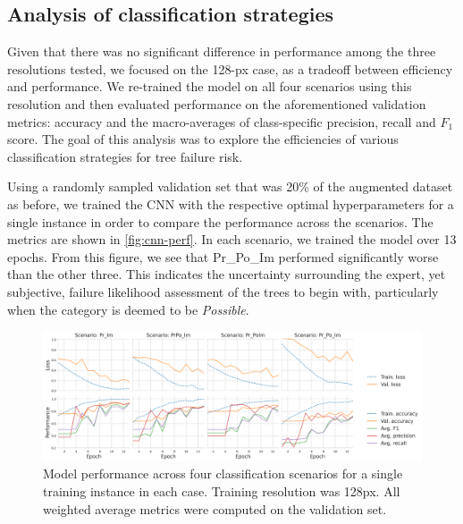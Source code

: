 \documentclass[NewProceedindgs, NoLineNumbers, SectionNumbers, letterpaper, SingleSpace, InsideFigs]{ascelike-new}
\begin{document}
 
\subsection{Analysis of classification strategies}
Given that there was no significant difference in performance among the three resolutions tested, we focused 
on the 128-px case, as a tradeoff between efficiency and performance. We re-trained the model on all four
scenarios using this resolution and then evaluated performance on the aforementioned validation metrics: accuracy and the macro-averages of
class-specific precision, recall and $F_{1}$ score.
The goal of this analysis was to explore the efficiencies of various classification strategies for tree failure risk.

Using a randomly sampled validation set that was 20\% of the augmented dataset as before, we trained the CNN with the
respective optimal hyperparameters for a single instance in order to compare the performance across the scenarios. The
metrics are shown in \autoref{fig:cnn-perf}.  In each scenario, we trained the model over 13 epochs. %
From this figure, we see that Pr\_Po\_Im performed significantly worse than the other three. This indicates the
uncertainty surrounding the expert, yet subjective, failure likelihood assessment of the trees to begin
with, particularly when the category is deemed to be \textit{Possible}. %

\begin{figure}[ht]
    \centering
    \includegraphics[width=1.05\textwidth]{cnn-performance-metrics-128px-plot}
    \caption{Model performance across four classification scenarios for a single training instance in each case. Training resolution was 128px. All weighted average metrics were computed on the validation set.}
    \label{fig:cnn-perf}
\end{figure}
\end{document}
